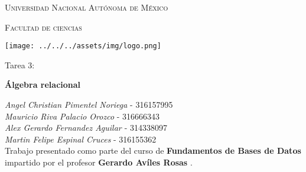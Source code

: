 \documentclass[10pt,letterpaper,fleqn]{article}
\begin{document}
    \begin{titlepage}
        \centering
    
        {\scshape\LARGE Universidad Nacional Autónoma de México \par}
    
        \vspace{1cm}
        {\scshape\Large Facultad de ciencias\par}
        \vspace{1.5cm}
    
        \begin{center}
            \texttt{[image: ../../../assets/img/logo.png]}
        \end{center}
    
        \vspace{.8 cm}
    
        {\LARGE Tarea 3: \par}
        {\huge\bfseries Álgebra relacional \par}
    
        \vspace{0.5cm}
        \large{\itshape{Angel Christian Pimentel Noriega}} \small{ - 316157995 } \\
        \large{\itshape{Mauricio Riva Palacio Orozco}} \small{ - 316666343 } \\
        \large{\itshape{Alex Gerardo Fernandez Aguilar }} \small{ - 314338097  } \\
        \large{\itshape{Martin Felipe Espinal Cruces}} \small{ - 316155362 } \\
        \vfill
        \vfill
        Trabajo presentado como parte del curso de
        \textbf{Fundamentos de Bases de Datos}
        impartido por el profesor \textbf{ Gerardo Avíles Rosas }. \par
        \vspace{0.1cm}
    \end{titlepage}
\end{document}
